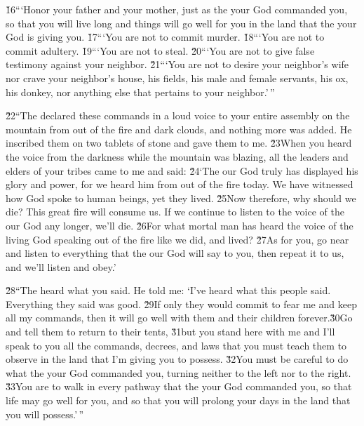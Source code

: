 \begin{bulletlist}
 \v{16}```Honor your father and your mother, just as the  your God commanded you, so that you will live long and things will go well for you in the land that the  your God is giving you.
 \v{17}```You are not to commit murder.
 \v{18}```You are not to commit adultery.
 \v{19}```You are not to steal.
 \v{20}```You are not to give false testimony against your neighbor.
 \v{21}```You are not to desire your neighbor's wife nor crave your neighbor's house, his fields, his male and female servants, his ox, his donkey, nor anything else that pertains to your neighbor.'\,''
\end{bulletlist}

\v{22}``The  declared these commands in a loud voice to your entire assembly on the mountain from out of the fire and dark clouds, and nothing more was added. He inscribed them on two tablets of stone and gave them to me. \v{23}When you heard the voice from the darkness while the mountain was blazing, all the leaders and elders of your tribes came to me and said: \v{24}`The  our God truly has displayed his glory and power, for we heard him from out of the fire today. We have witnessed how God spoke to human beings, yet they lived. \v{25}Now therefore, why should we die? This great fire will consume us. If we continue to listen to the voice of the  our God any longer, we'll die. \v{26}For what mortal man has heard the voice of the living God speaking out of the fire like we did, and lived? \v{27}As for you, go near and listen to everything that the  our God will say to you, then repeat it to us, and we'll listen and obey.'

\v{28}``The  heard what you said. He told me: `I've heard what this people said. Everything they said was good. \v{29}If only they would commit to fear me and keep all my commands, then it will go well with them and their children forever.\v{30}Go and tell them to return to their tents, \v{31}but you stand here with me and I'll speak to you all the commands, decrees, and laws that you must teach them to observe in the land that I'm giving you to possess. \v{32}You must be careful to do what the  your God commanded you, turning neither to the left nor to the right. \v{33}You are to walk in every pathway that the  your God commanded you, so that life may go well for you, and so that you will prolong your days in the land that you will possess.'\,''

